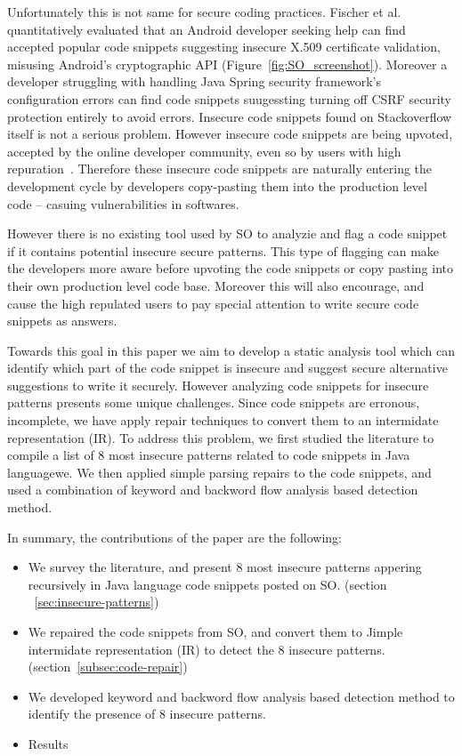    Unfortunately this is not same for secure coding practices. Fischer et al.~\cite{fischer2017stack} quantitatively evaluated that an Android developer seeking help can find accepted popular code snippets suggesting insecure X.509 certificate validation, misusing Android’s cryptographic API (Figure~\ref{fig:SO_screenshot}). Moreover a developer struggling with handling Java Spring security framework's configuration errors can find code snippets suugessting turning off CSRF security protection entirely to avoid errors. Insecure code snippets found on Stackoverflow itself is not a serious problem. However insecure code snippets are being upvoted, accepted by the online developer community, even so by users with high repuration~\cite{meng2018secure}. Therefore these insecure code snippets are naturally entering the development cycle by developers copy-pasting them into the production level code -- casuing vulnerabilities in softwares.

   
   
   However there is no existing tool used by SO to analyzie and flag a code snippet if it contains potential insecure secure patterns.
   This type of flagging can make the developers more aware before upvoting the code snippets or copy pasting into their own production level code base. Moreover this will also encourage, and cause the high repulated users to pay special attention to write secure code snippets as answers. 
   
   Towards this goal in this paper we aim to develop a static analysis tool  which can identify which part of the code snippet is insecure and suggest secure alternative suggestions to write it securely. However analyzing code snippets for insecure patterns presents some unique challenges. Since  code snippets are erronous, incomplete, we have apply repair techniques to convert them to an intermidate representation (IR). 
   To address this problem, we first studied the literature to compile a list of 8 most insecure patterns related to code snippets in Java languagewe. We then applied simple parsing repairs to the code snippets, and used a combination of keyword and backword flow analysis based detection method. 
   
   In summary, the contributions of the paper are the following: 
   \begin{itemize}
   \item We survey the literature, and present 8 most insecure patterns appering recursively in Java language code snippets posted on SO. (section ~\ref{sec:insecure-patterns})      
   \item We repaired the code snippets from SO, and convert them to Jimple intermidate representation (IR) to detect the 8 insecure patterns. (section~\ref{subsec:code-repair}) 
   \item  We developed keyword and backword flow analysis based detection method to identify the presence of 8 insecure patterns.
   \item Results
   \end{itemize}

